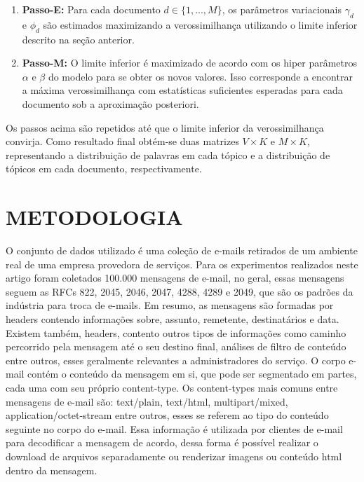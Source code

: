 \documentclass[12pt,a4paper]{article}
\begin{document}
  \begin{enumerate}
  \item \textbf{Passo-E:} Para cada documento $d \in \{1,. . . , M\}$, os parâmetros variacionais $\gamma_d$ e $\phi_d$ são estimados maximizando a verossimilhança utilizando o limite inferior descrito na seção anterior.
  \item \textbf{Passo-M:} O limite inferior é maximizado  de acordo com os hiper parâmetros $\alpha$ e $\beta$ do modelo para se obter os novos valores. Isso corresponde a encontrar a máxima verossimilhança com estatísticas suficientes esperadas para cada documento sob a aproximação posteriori.
  \end{enumerate}
  
  Os passos acima são repetidos até que o limite inferior da verossimilhança convirja. Como resultado final obtém-se duas matrizes $V \times K$ e $M \times K$, representando  a distribuição de palavras em cada tópico e a distribuição de tópicos em cada documento, respectivamente.
  
  
  
  \section{METODOLOGIA}
  O conjunto de dados utilizado é uma coleção de e-mails retirados de um ambiente real de uma empresa provedora de serviços. Para os experimentos realizados neste artigo foram coletados 100.000 mensagens de e-mail, no geral, essas mensagens seguem as RFCs 822, 2045, 2046, 2047, 4288, 4289 e 2049, que são os padrões da indústria para troca de e-mails.
    Em resumo, as mensagens são formadas por headers contendo informações sobre, assunto, remetente, destinatários e data. Existem também, headers, contento outros tipos de informações como caminho percorrido pela mensagem até o seu destino final, análises de filtro de conteúdo entre outros, esses geralmente relevantes a administradores do serviço. O corpo e-mail contém o conteúdo da mensagem em si, que pode ser segmentado em  partes, cada uma com seu próprio content-type. Os content-types mais comuns entre mensagens de e-mail são: text/plain, text/html, multipart/mixed, application/octet-stream entre outros, esses se referem ao tipo do conteúdo seguinte no corpo do e-mail. Essa informação é utilizada por clientes de e-mail para decodificar a mensagem de acordo, dessa forma é possível realizar o download de arquivos separadamente ou renderizar imagens ou conteúdo html dentro da mensagem.
  
\end{document}
